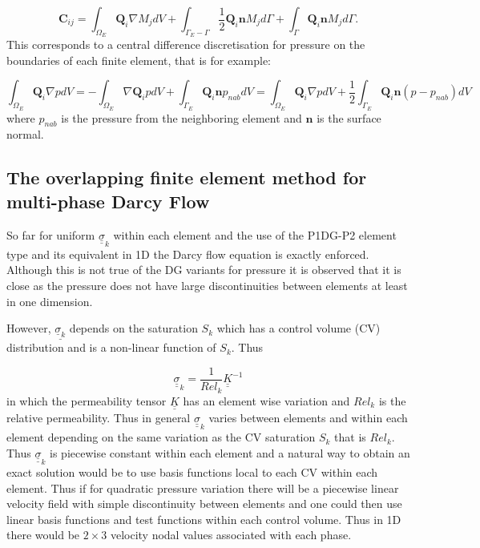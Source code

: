 \begin{equation}
{\mathbf C}_{ij}=\int_{\Omega_E} {\mathbf Q}_i \nabla M_j dV 
+ \int_{\Gamma_{E}-\Gamma} \frac{1}{2}{\mathbf Q}_i {\mathbf n} M_j d\Gamma 
+ \int_\Gamma {\mathbf Q}_i {\mathbf n} M_j d\Gamma .
\end{equation}
This corresponds to a central difference discretisation for pressure 
on the boundaries of each finite element, that is for example:

\begin{equation}
\int_{\Omega_E} {\mathbf Q}_i \nabla p dV = -\int_{\Omega_E} \nabla {\mathbf Q}_i  p dV 
+ \int_{\Gamma_E} {\mathbf Q}_i {\mathbf n} p_{nab} dV 
= \int_{\Omega_E} {\mathbf Q}_i \nabla p dV 
+ \frac{1}{2} \int_{\Gamma_E} {\mathbf Q}_i {\mathbf n} (p-p_{nab}) dV
\label{dg-sat-form}
\end{equation}
where $p_{nab}$ is the pressure from the neighboring 
element and ${\mathbf n}$ is the surface normal. 


\subsection{The overlapping finite element method for multi-phase Darcy Flow} 

So far for uniform ${\underline{\underline \sigma}}_k$ within each element and the use of the P1DG-P2 element type 
and its equivalent in 1D the Darcy flow equation is 
exactly enforced. Although this is not true of the DG variants 
for pressure it is observed that it is close 
as the pressure does not have large discontinuities 
between elements at least in one dimension. 

However, ${\underline{\underline \sigma_k}}$ depends on the saturation $S_k$ which has 
a control volume (CV) distribution and is a non-linear function of $S_k$. 
Thus 			

\begin{equation}
{\underline {\underline \sigma}}_k 
= \frac{1}{{Rel}_k} {\underline{\underline K}}^{-1} 	
\end{equation}
in which the permeability tensor 
${\underline{\underline K}}$ has an element wise variation 
and ${Rel}_k$ is the relative permeability. 
Thus in general ${\underline {\underline \sigma}}_k$ varies between elements and within each element 
depending on the same variation as the CV saturation $S_k$ that is $Rel_k$. 
Thus ${\underline {\underline \sigma}}_k$ is piecewise constant 
within each element and a natural 
way to obtain an exact solution would be to use basis functions 
local to each CV within each element. 
Thus if for quadratic pressure variation there will be 
a piecewise 
linear velocity field with simple discontinuity between 
elements and one could then use linear basis functions 
and test functions within each control volume. Thus in 1D 
there would be $2\times 3$ velocity nodal values associated with 
each phase.  


